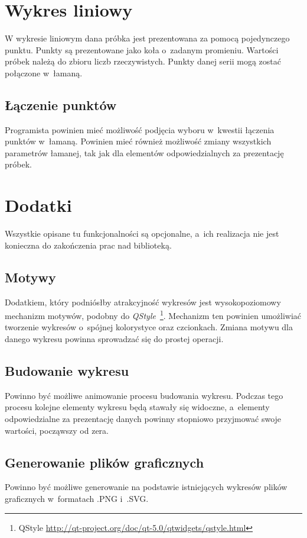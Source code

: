 \section{Wykres liniowy}
W wykresie liniowym dana próbka jest prezentowana za pomocą pojedynczego punktu. Punkty są prezentowane jako koła o~zadanym promieniu. Wartości próbek należą do zbioru liczb rzeczywistych. Punkty danej serii mogą zostać połączone w~łamaną.

\subsection{Łączenie punktów}
Programista powinien mieć możliwość podjęcia wyboru w~kwestii łączenia punktów w~łamaną. Powinien mieć również możliwość zmiany wszystkich parametrów łamanej, tak jak dla elementów odpowiedzialnych za prezentację próbek.

\section{Dodatki}
Wszystkie opisane tu funkcjonalności są opcjonalne, a~ich realizacja nie jest konieczna do zakończenia prac nad biblioteką.

\subsection{Motywy}
Dodatkiem, który podniósłby atrakcyjność wykresów jest wysokopoziomowy mechanizm motywów, podobny do \textit{QStyle}~\footnote{QStyle \url{http://qt-project.org/doc/qt-5.0/qtwidgets/qstyle.html}}. Mechanizm ten powinien umożliwiać tworzenie wykresów o~spójnej kolorystyce oraz czcionkach. Zmiana motywu dla danego wykresu powinna sprowadzać się do prostej operacji.

\subsection{Budowanie wykresu}
Powinno być możliwe animowanie procesu budowania wykresu. Podczas tego procesu kolejne elementy wykresu będą stawały się widoczne, a~elementy odpowiedzialne za prezentację danych powinny stopniowo przyjmować swoje wartości, począwszy od zera.

\subsection{Generowanie plików graficznych}
Powinno być możliwe generowanie na podstawie istniejących wykresów plików graficznych  w~formatach .PNG i~.SVG.


